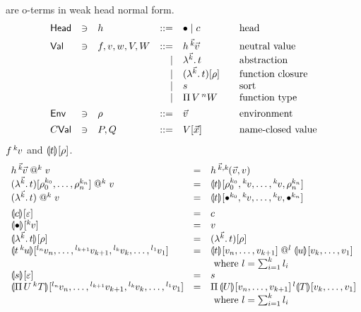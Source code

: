 \documentclass[a4paper]{article}
\makeatletter
\newcommand{\oann}[1]{{}^{#1}\kern-0.15ex}
\newcommand{\ovar}{\mathord{\bullet}}
\newcommand{\oapp}[1]{\,\oann{#1}}
\newcommand{\olam}[1]{\lambda^{#1}.\,}
\newcommand{\opi}[2]{\Pi\,#1\,^{#2}}
\renewcommand{\esubst}[2]{#1[#2]}
\renewcommand{\sempty}{\varepsilon}
\newcommand{\Head}{\mathsf{Head}}
\newcommand{\vapp}[1]{\mathrel{@^{#1}}}
\renewcommand{\eval}[2]{\dent{#1}{}[#2]}
\makeatother
\begin{document}
 are o-terms in weak head normal form.
\[
\begin{array}{lllrl@{\qquad}l}
\Head & \ni & h & ::= &  \ovar \mid c & \mbox{head} \\[1ex]
\Val & \ni & f,v,w,V,W & ::= & h \oapp {\vec k} {\vec v} & \mbox{neutral
  value} \\
&&& \mid & \olam {\vec k} t & \mbox{abstraction} \\
&&& \mid & \esubst{(\olam {\vec k} t)}{\rho} & \mbox{function closure} \\
&&& \mid & s & \mbox{sort} \\
&&& \mid & \opi V n W & \mbox{function type} \\[1ex]
\Env & \ni & \rho & ::= & \vec v & \mbox{environment} \\[1ex]
C\Val& \ni & P,Q & ::= & \esubst V {\vec x} & \mbox{name-closed value} \\
\end{array}
\]
 $f \oapp k v$ and $\eval t \rho$.
\[
\begin{array}{lll}
  h \oapp {\vec k} {\vec v} \vapp k v 
    & = & h \oapp{\vec k,k} {(\vec v,v)} \\
  \esubst{(\olam {\vec k} t)}{\rho_0^{k_0},\dots,\rho_n^{k_n}} \vapp k v
    & = & \eval t
    {\rho_0^{k_0},\oann{k}v,\dots,\oann{k}v,\rho_n^{k_n}}
\\
  (\olam {\vec k} t) \vapp k v
    & = & \eval t
    {\ovar^{k_0},\oann{k}v,\dots,\oann{k}v,\ovar^{k_n}}
\\[1ex]
  \eval c {\sempty} & = & c \\
  \eval \ovar {\oann k v} & = & v \\
  \eval {\olam{\vec k}t} \rho & = & \esubst {(\olam{\vec k}t)} \rho
  \\
  \eval {t \oapp k u} {\oann{l_n}v_n,\dots,\oann{l_{k+1}}v_{k+1},
                       \oann{l_k}v_k,\dots,\oann{l_1}v_1} 
    & = & \eval t {v_n,\dots,v_{k+1}} \vapp l \eval u {v_k,\dots,v_1}
\\ &&      \mbox{ where } l = \sum_{i=1}^k l_i \\
  \eval s \sempty & = & s \\
  \eval {\opi U k T} {\oann{l_n}v_n,\dots,\oann{l_{k+1}}v_{k+1},
                       \oann{l_k}v_k,\dots,\oann{l_1}v_1} 
    & = & \opi {\eval U {v_n,\dots,v_{k+1}}} l {\eval T {v_k,\dots,v_1}}
\\ &&      \mbox{ where } l = \sum_{i=1}^k l_i \\
\end{array}
\]
\end{document}
